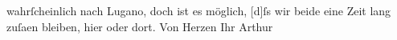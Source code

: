 \begin{ledgroupsized}[t]{13cm}
               wahrſcheinlich nach Lugano, doch ist es möglich,
                  {[}d{]}ſs wir beide \introOben{}eine Zeit lang\introOben{} zuſa{\geminationm}en bleiben, hier oder dort. Von Herzen Ihr
                  \spacefill\mbox{Arthur}\pend
           \endnumbering{}\end{ledgroupsized}  \newcommand{\dateiname}{L00834}\newcommand{\titel}{Arthur Schnitzler an Richard Beer-Hofmann, 13. 8. 1898}\newcommand{\editorInnen}{Martin Anton Müller und Gerd-Hermann Susen}
            \footnotesize
\begin{ledgroupsized}[t]{11.5cm}
\end{ledgroupsized}
         
      